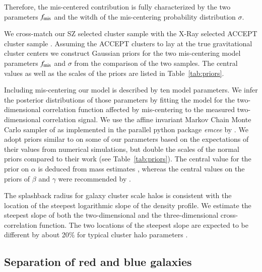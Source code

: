 \documentclass[iop, apjl, twocolappendix, numberedappendix]{emulateapj}
\begin{document}
Therefore, the mis-centered contribution is fully characterized by the two parameters $f_{\rm mis}$ and the witdh 
of the mis-centering probability distribution $\sigma$.
\newline

We cross-match our SZ selected cluster sample with the X-Ray selected ACCEPT cluster sample \citep{cavagnolo2009vizier}.
Assuming the ACCEPT clusters to lay at the true gravitational cluster centers we construct Gaussian priors
for the two mis-centering model parameters $f_{\rm mis}$ and $\sigma$ from the comparison of the 
two samples. The central values as well as the scales of the priors are listed in Table~\ref{tab:priors}.



Including mis-centering our model is described by ten model parameters.
We infer the posterior distributions of those parameters by fitting the model for the two-dimensional correlation
function affected by mis-centering to the measured two-dimensional correlation signal. 
We use the affine invariant Markov Chain Monte Carlo sampler of \citet{goodman2010ensemble} as
implemented in the parallel python package {\it emcee} by
\citet{foreman2013emcee}. We adopt priors similar to
\citet{more2016detection} on some of our parameters based on the
expectations of their values from numerical simulations, but double
the scales of the normal priors compared to their work (see
Table~\ref{tab:priors}). The central value for the prior on $\alpha$
is deduced from mass estimates \citep{gao2008redshift}, whereas the
central values on the priors of $\beta$ and $\gamma$ were
recommended by \citet{diemer2014dependence}.

The splashback radius for galaxy cluster scale halos is consistent
with the location of the steepest logarithmic slope of the density
profile. We estimate the steepest slope of both the two-dimensional
and the three-dimensional cross-correlation function. The two
locations of the steepest slope are expected to be different by
about 20\% for typical cluster halo parameters
\citep{diemer2014dependence, more2016detection}.

\subsection{Separation of red and blue galaxies}
\label{sec:Color}
\end{document}
